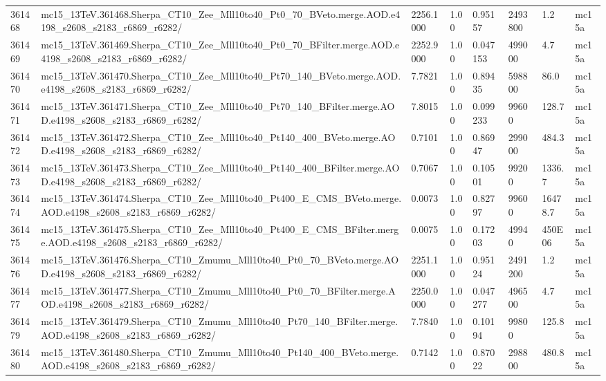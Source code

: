 \begin{sidewaystable}[!htp]
\begin{center}
{\begin{tabular}{llllllll}
361468  &  mc15\_13TeV.361468.Sherpa\_CT10\_Zee\_Mll10to40\_Pt0\_70\_BVeto.merge.AOD.e4198\_s2608\_s2183\_r6869\_r6282/  &  2256.1000  &  1.00  &  0.95157  &  2493800  &  1.2  &  mc15a \\
361469  &  mc15\_13TeV.361469.Sherpa\_CT10\_Zee\_Mll10to40\_Pt0\_70\_BFilter.merge.AOD.e4198\_s2608\_s2183\_r6869\_r6282/  &  2252.9000  &  1.00  &  0.047153  &  499000  &  4.7  &  mc15a \\
361470  &  mc15\_13TeV.361470.Sherpa\_CT10\_Zee\_Mll10to40\_Pt70\_140\_BVeto.merge.AOD.e4198\_s2608\_s2183\_r6869\_r6282/  &  7.7821  &  1.00  &  0.89435  &  598800  &  86.0  &  mc15a \\
361471  &  mc15\_13TeV.361471.Sherpa\_CT10\_Zee\_Mll10to40\_Pt70\_140\_BFilter.merge.AOD.e4198\_s2608\_s2183\_r6869\_r6282/  &  7.8015  &  1.00  &  0.099233  &  99600  &  128.7  &  mc15a \\
361472  &  mc15\_13TeV.361472.Sherpa\_CT10\_Zee\_Mll10to40\_Pt140\_400\_BVeto.merge.AOD.e4198\_s2608\_s2183\_r6869\_r6282/  &  0.7101  &  1.00  &  0.86947  &  299000  &  484.3  &  mc15a \\
361473  &  mc15\_13TeV.361473.Sherpa\_CT10\_Zee\_Mll10to40\_Pt140\_400\_BFilter.merge.AOD.e4198\_s2608\_s2183\_r6869\_r6282/  &  0.7067  &  1.00  &  0.10501  &  99200  &  1336.7  &  mc15a \\
361474  &  mc15\_13TeV.361474.Sherpa\_CT10\_Zee\_Mll10to40\_Pt400\_E\_CMS\_BVeto.merge.AOD.e4198\_s2608\_s2183\_r6869\_r6282/  &  0.0073  &  1.00  &  0.82797  &  99600  &  16478.7  &  mc15a \\
361475  &  mc15\_13TeV.361475.Sherpa\_CT10\_Zee\_Mll10to40\_Pt400\_E\_CMS\_BFilter.merge.AOD.e4198\_s2608\_s2183\_r6869\_r6282/  &  0.0075  &  1.00  &   0.17203  &  49940  &  450E06  &  mc15a \\
361476  &  mc15\_13TeV.361476.Sherpa\_CT10\_Zmumu\_Mll10to40\_Pt0\_70\_BVeto.merge.AOD.e4198\_s2608\_s2183\_r6869\_r6282/  &  2251.1000  &  1.00  &  0.95124  &  2491200  &  1.2  &  mc15a \\
361477  &  mc15\_13TeV.361477.Sherpa\_CT10\_Zmumu\_Mll10to40\_Pt0\_70\_BFilter.merge.AOD.e4198\_s2608\_s2183\_r6869\_r6282/  &  2250.0000  &  1.00  &  0.047277  &  496500  &  4.7  &  mc15a \\
361479  &  mc15\_13TeV.361479.Sherpa\_CT10\_Zmumu\_Mll10to40\_Pt70\_140\_BFilter.merge.AOD.e4198\_s2608\_s2183\_r6869\_r6282/  &  7.7840  &  1.00  &  0.10194  &  99800  &  125.8  &  mc15a \\
361480  &  mc15\_13TeV.361480.Sherpa\_CT10\_Zmumu\_Mll10to40\_Pt140\_400\_BVeto.merge.AOD.e4198\_s2608\_s2183\_r6869\_r6282/  &  0.7142  &  1.00  &  0.87022  &  298800  &  480.8  &  mc15a \\

\end{tabular}}
\end{center}
\end{sidewaystable}
